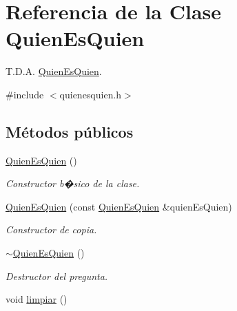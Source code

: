 \hypertarget{classQuienEsQuien}{}\section{Referencia de la Clase Quien\+Es\+Quien}
\label{classQuienEsQuien}


T.\+D.\+A. \hyperlink{classQuienEsQuien}{Quien\+Es\+Quien}.  




{\ttfamily \#include $<$quienesquien.\+h$>$}

\subsection*{Métodos públicos}
\begin{DoxyCompactItemize}
\item 
\hyperlink{classQuienEsQuien_a2942486f1ff134fec70e5d21d7916a2e}{Quien\+Es\+Quien} ()\hypertarget{classQuienEsQuien_a2942486f1ff134fec70e5d21d7916a2e}{}\label{classQuienEsQuien_a2942486f1ff134fec70e5d21d7916a2e}

\begin{DoxyCompactList}\small\item\em Constructor b�sico de la clase. \end{DoxyCompactList}\item 
\hyperlink{classQuienEsQuien_a362b7513eba83170d18d98946bc01d87}{Quien\+Es\+Quien} (const \hyperlink{classQuienEsQuien}{Quien\+Es\+Quien} \&quien\+Es\+Quien)
\begin{DoxyCompactList}\small\item\em Constructor de copia. \end{DoxyCompactList}\item 
\hyperlink{classQuienEsQuien_ade80093df9e450c6e37e8992da112a70}{$\sim$\+Quien\+Es\+Quien} ()\hypertarget{classQuienEsQuien_ade80093df9e450c6e37e8992da112a70}{}\label{classQuienEsQuien_ade80093df9e450c6e37e8992da112a70}

\begin{DoxyCompactList}\small\item\em Destructor del pregunta. \end{DoxyCompactList}\item 
void \hyperlink{classQuienEsQuien_a17703bc3277c2846fa67f857894366cd}{limpiar} ()\hypertarget{classQuienEsQuien_a17703bc3277c2846fa67f857894366cd}{}\label{classQuienEsQuien_a17703bc3277c2846fa67f857894366cd}


\end{DoxyCompactItemize}

